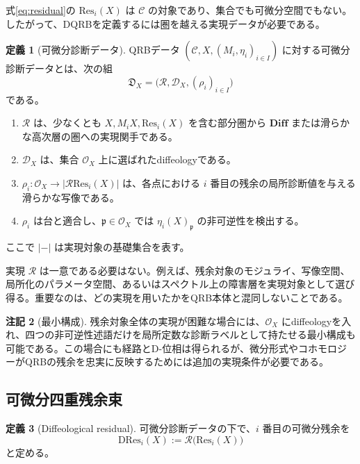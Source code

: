 \documentclass[a4paper,11pt]{ltjsarticle}
\theoremstyle{definition}
\newtheorem{definition}{定義}[section]
\newtheorem{remark}[definition]{注記}
\theoremstyle{plain}
\newcommand{\Diff}{\mathbf{Diff}}
\newcommand{\Res}{\mathrm{Res}}
\newcommand{\DRes}{\mathrm{DRes}}
\begin{document}
式\eqref{eq:residual}の $\Res_i(X)$ は $\mathcal C$ の対象であり、集合でも可微分空間でもない。したがって、DQRBを定義するには圏を越える実現データが必要である。

\begin{definition}[可微分診断データ]
QRBデータ $(\mathcal C,X,(M_i,\eta_i)_{i\in I})$ に対する可微分診断データとは、次の組
\begin{equation}
 \mathfrak D_X=
 \bigl(\mathcal R,\mathcal D_X,
 (\rho_i)_{i\in I}\bigr)
 \label{eq:diagnostic-data}
\end{equation}
である。
\begin{enumerate}
 \item $\mathcal R$ は、少なくとも $X,M_iX,\Res_i(X)$ を含む部分圏から $\Diff$ または滑らかな高次層の圏への実現関手である。
 \item $\mathcal D_X$ は、集合 $\mathcal O_X$ 上に選ばれたdiffeologyである。
 \item $\rho_i:\mathcal O_X\to |\mathcal R\Res_i(X)|$ は、各点における $i$ 番目の残余の局所診断値を与える滑らかな写像である。
 \item $\rho_i$ は台と適合し、$\mathfrak p\in\mathcal O_X$ では $\eta_i(X)_{\mathfrak p}$ の非可逆性を検出する。
\end{enumerate}
ここで $|{-}|$ は実現対象の基礎集合を表す。
\end{definition}

実現 $\mathcal R$ は一意である必要はない。例えば、残余対象のモジュライ、写像空間、局所化のパラメータ空間、あるいはスペクトル上の障害層を実現対象として選び得る。重要なのは、どの実現を用いたかをQRB本体と混同しないことである。

\begin{remark}[最小構成]
残余対象全体の実現が困難な場合には、$\mathcal O_X$ にdiffeologyを入れ、四つの非可逆性述語だけを局所定数な診断ラベルとして持たせる最小構成も可能である。この場合にも経路とD-位相は得られるが、微分形式やコホモロジーがQRBの残余を忠実に反映するためには追加の実現条件が必要である。
\end{remark}

\subsection{可微分四重残余束}

\begin{definition}[Diffeological residual]
可微分診断データの下で、$i$ 番目の可微分残余を
\begin{equation}
 \DRes_i(X):=\mathcal R\bigl(\Res_i(X)\bigr)
 \end{equation}
と定める。
\end{definition}
\end{document}
